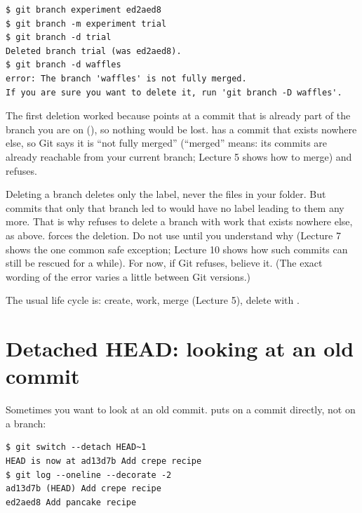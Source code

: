 \begin{lstlisting}
$ git branch experiment ed2aed8
$ git branch -m experiment trial
$ git branch -d trial
Deleted branch trial (was ed2aed8).
$ git branch -d waffles
error: The branch 'waffles' is not fully merged.
If you are sure you want to delete it, run 'git branch -D waffles'.
\end{lstlisting}

The first deletion worked because  points at a commit that is already part of the branch you are on (), so nothing would be lost.  has a commit that exists nowhere else, so Git says it is ``not fully merged'' (``merged'' means: its commits are already reachable from your current branch; Lecture 5 shows how to merge) and refuses.

\begin{pitfall}
Deleting a branch deletes only the label, never the files in your folder. But commits that only that branch led to would have no label leading to them any more. That is why  refuses to delete a branch with work that exists nowhere else, as above.  forces the deletion. Do not use  until you understand why (Lecture 7 shows the one common safe exception; Lecture 10 shows how such commits can still be rescued for a while). For now, if Git refuses, believe it. (The exact wording of the error varies a little between Git versions.)
\end{pitfall}

The usual life cycle is: create, work, merge (Lecture 5), delete with .

\section{Detached HEAD: looking at an old commit}

Sometimes you want to look at an old commit.  puts  on a commit directly, not on a branch:

\begin{lstlisting}
$ git switch --detach HEAD~1
HEAD is now at ad13d7b Add crepe recipe
$ git log --oneline --decorate -2
ad13d7b (HEAD) Add crepe recipe
ed2aed8 Add pancake recipe
\end{lstlisting}

